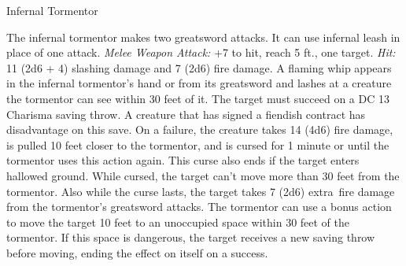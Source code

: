 \documentclass[10pt,a4paper,twoside,twocolumn,openany,bg=print,nodeprecatedcode]{dndbook}
\begin{document}
\clearpage

\begin{DndMonster}[float*=t]{Infernal Tormentor}
\DndMonsterBasics[
armor-class = {16 (half plate armor)},
hit-points = {\DndDice{13d8 + 39}},
speed = {30 ft.}
]
\DndMonsterAbilityScores[
 str = 18,
 dex = 12,
 con = 16,
 int = 12,
 wis = 13,
 cha = 15
]
\DndMonsterDetails[
skills = {Intimidation +5, Perception +4},
damage-resistances = {fire},
senses = {darkvision 60 ft., passive perception 14},
languages = {Infernal and one other language},
challenge = 6,
]
\par
{}
The infernal tormentor makes two greatsword attacks. It can use infernal leash in place of one attack.
\textsl{Melee Weapon Attack:} +7 to hit, reach 5 ft., one target. \textsl{Hit:} 11 (2d6 + 4) slashing damage and 7 (2d6) fire damage.
A flaming whip appears in the infernal tormentor's hand or from its greatsword and lashes at a creature the tormentor can see within 30 feet of it. The target must succeed on a DC 13 Charisma saving throw. A creature that has signed a fiendish contract has disadvantage on this save. On a failure, the creature takes 14 (4d6) fire damage, is pulled 10 feet closer to the tormentor, and is cursed for 1 minute or until the tormentor uses this action again. This curse also ends if the target enters hallowed ground.
While cursed, the target can't move more than 30 feet from the tormentor. Also while the curse lasts, the target takes 7 (2d6) extra fire damage from the tormentor's greatsword attacks. The tormentor can use a bonus action to move the target 10 feet to an unoccupied space within 30 feet of the tormentor. If this space is dangerous, the target receives a new saving throw before moving, ending the effect on itself on a success.
\end{DndMonster}
\end{document}
